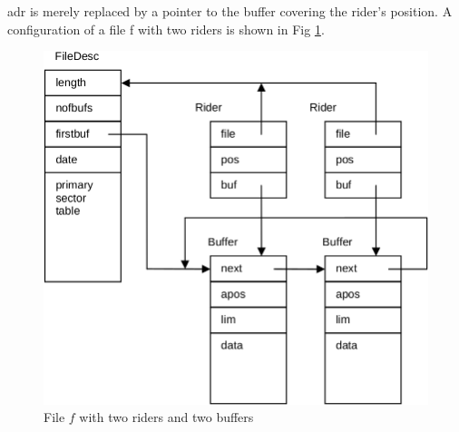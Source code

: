 \begin{enumerate}
adr is merely replaced by a pointer to the buffer covering the rider's position. A configuration of a
file f with two riders is shown in Fig \ref{fig:file}.
	\begin{figure}
		\flushright
		\label{fig:file}
		\includegraphics[width=.9\textwidth]{i/m}
		\caption{File $f$ with two riders and two buffers}
	\end{figure}
\end{enumerate}

